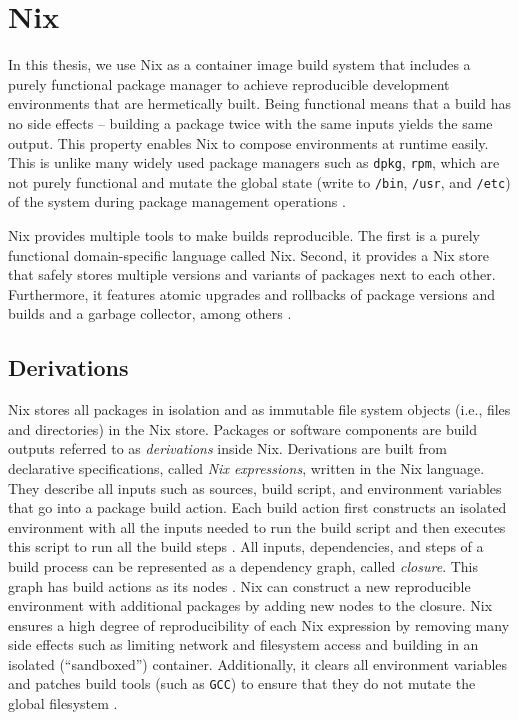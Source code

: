 \section{Nix}\label{Nix-theory}
In this thesis, we use Nix as a container image build system that includes a purely functional package manager to achieve reproducible development environments that are hermetically built. Being functional means that a build has no side effects -- building a package twice with the same inputs yields the same output. This property enables Nix to compose environments at runtime easily. This is unlike many widely used package managers such as \verb|dpkg|, \verb|rpm|, which are not purely functional and mutate the global state (write to \verb|/bin|, \verb|/usr|, and \verb|/etc|) of the system during package management operations \cite{NixPills1}\cite{vanDerBurg2012}.

Nix provides multiple tools to make builds reproducible. The first is a purely functional domain-specific language called Nix. Second, it provides a Nix store that safely stores multiple versions and variants of packages next to each other. Furthermore, it features atomic upgrades and rollbacks of package versions and builds and a garbage collector, among others \cite{vanDerBurg2012}. %

\subsection{Derivations}\label{Nix-derivations}
Nix stores all packages in isolation and as immutable file system objects (i.e., files and directories) in the Nix store. Packages or software components are build outputs referred to as \emph{derivations} inside Nix. Derivations are built from declarative specifications, called \emph{Nix expressions}, written in the Nix language. They describe all inputs such as sources, build script, and environment variables that go into a package build action. Each build action first constructs an isolated environment with all the inputs needed to run the build script and then executes this script to run all the build steps \cite{vanDerBurg2012}\cite{NixPills1}. All inputs, dependencies, and steps of a build process can be represented as a dependency graph, called \emph{closure}. This graph has build actions as its nodes \cite{NixPills3}. Nix can construct a new reproducible environment with additional packages by adding new nodes to the closure. Nix ensures a high degree of reproducibility of each Nix expression by removing many side effects such as limiting network and filesystem access and building in an isolated (``sandboxed'') container. Additionally, it clears all environment variables and patches build tools (such as \verb|GCC|) to ensure that they do not mutate the global filesystem \cite{vanDerBurg2012}. 

